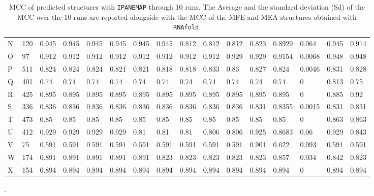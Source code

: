 \documentclass[11pt]{article} %
\newcommand\HeatSecset[1]{\pgfkeys{/heatsec, #1}}
\newcommand{\Software}[1]{\texttt{#1}}
\newcommand{\OurTool}{\Software{IPANEMAP}}
\begin{document}
\begin{table}
\begin{adjustbox}{max width=\textwidth,max totalheight=\textheight,keepaspectratio}
\begin{tabular}{llHHHHHHHHHHHlHH}
N	&	120	&	0.945	&	0.945	&	0.945	&		0.945	&	0.945	&	0.945	&	0.812	&	0.812	&	0.812	&	0.823	&	0.8929	&	0.064	&	0.945	&	0.914	\\
O	&	97	&	0.912	&	0.912	&	0.912	&		0.912	&	0.912	&	0.912	&	0.912	&	0.912	&	0.929	&	0.929	&	0.9154	&	0.0068	&	0.948	&	0.948	\\
P	&	511	&	0.824	&	0.824	&	0.824	&		0.821	&	0.821	&	0.818	&	0.818	&	0.833	&	0.83	&	0.827	&	0.824	&	0.0046	&	0.831	&	0.828	\\
Q	&	401	&	0.74	&	0.74	&	0.74	&		0.74	&	0.74	&	0.74	&	0.74	&	0.74	&	0.74	&	0.74	&	0.74	&	0	&	0.813	&	0.75	\\
R	&	425	&	0.895	&	0.895	&	0.895	&		0.895	&	0.895	&	0.895	&	0.895	&	0.895	&	0.895	&	0.895	&	0.895	&	0	&	0.885	&	0.92	\\
S	&	336	&	0.836	&	0.836	&	0.836	&		0.836	&	0.836	&	0.836	&	0.836	&	0.836	&	0.836	&	0.831	&	0.8355	&	0.0015	&	0.831	&	0.831	\\
T	&	473	&	0.85	&	0.85	&	0.85	&		0.85	&	0.85	&	0.85	&	0.85	&	0.85	&	0.85	&	0.85	&	0.85	&	0	&	0.863	&	0.863	\\
U	&	412	&	0.929	&	0.929	&	0.929	&		0.929	&	0.81	&	0.81	&	0.81	&	0.806	&	0.806	&	0.925	&	0.8683	&	0.06	&	0.929	&	0.843	\\
V	&	75	&	0.591	&	0.591	&	0.591	&		0.591	&	0.591	&	0.591	&	0.591	&	0.591	&	0.591	&	0.901	&	0.622	&	0.093	&	0.591	&	0.591	\\
W	&	174	&	0.891	&	0.891	&	0.891	&		0.891	&	0.891	&	0.823	&	0.823	&	0.823	&	0.823	&	0.823	&	0.857	&	0.034	&	0.842	&	0.823	\\
X	&	154	&	0.894	&	0.894	&	0.894	&		0.894	&	0.894	&	0.894	&	0.894	&	0.894	&	0.894	&	0.894	&	0.894	&	0	&	0.894	&	0.894	\\


\bottomrule
\end{tabular}
\end{adjustbox}
\caption{MCC of predicted structures with \OurTool{} through 10 runs. The Average and the standard deviation (Sd) of the MCC over the 10 runs are reported alongside with the MCC of the MFE and MEA structures obtained with \Software{RNAfold}.}.
\end{table}



\end{document}
